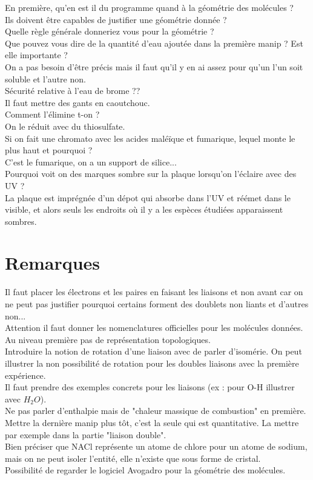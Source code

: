 \documentclass[12pt,prb,aps,epsf]{article}
\begin{document}
En première, qu'en est il du programme quand à la géométrie des molécules ? \\
Ils doivent être capables de justifier une géométrie donnée ?\\

Quelle règle générale donneriez vous pour la géométrie ?\\

Que pouvez vous dire de la quantité d'eau ajoutée dans la première manip ? Est elle importante ?\\
On a pas besoin d'être précis mais il faut qu'il y en ai assez pour qu'un l'un soit soluble et l'autre non.\\

Sécurité relative à l'eau de brome ??\\
Il faut mettre des gants en caoutchouc. \\

Comment l'élimine t-on ?\\
On le réduit avec du thiosulfate.\\

Si on fait une chromato avec les acides maléïque et fumarique, lequel monte le plus haut et pourquoi ?\\
C'est le fumarique, on a un support de silice...\\

Pourquoi voit on des marques sombre sur la plaque lorsqu'on l'éclaire avec des UV ?\\
La plaque est imprégnée d'un dépot qui absorbe dans l'UV et réémet dans le visible, et alors seuls les endroits où il y a les espèces étudiées apparaissent sombres.

\section*{Remarques}
Il faut placer les électrons et les paires en faisant les liaisons et non avant car on ne peut pas justifier pourquoi certains forment des doublets non liants et d'autres non...\\
Attention il faut donner les nomenclatures officielles pour les molécules données.\\
Au niveau première pas de représentation topologiques.\\
Introduire la notion de rotation d'une liaison avec de parler d'isomérie. On peut illustrer la non possibilité de rotation pour les doubles liaisons avec la première expérience.\\
Il faut prendre des exemples concrets pour les liaisons (ex : pour O-H illustrer avec $H_2O$).\\
Ne pas parler d'enthalpie mais de "chaleur massique de combustion" en première.\\
Mettre la dernière manip plus tôt, c'est la seule qui est quantitative. La mettre par exemple dans la partie "liaison double".\\
Bien préciser que NACl représente un atome de chlore pour un atome de sodium, mais on ne peut isoler l'entité, elle n'existe que sous forme de cristal.\\

Possibilité de regarder le logiciel Avogadro pour la géométrie des molécules.
\end{document}
